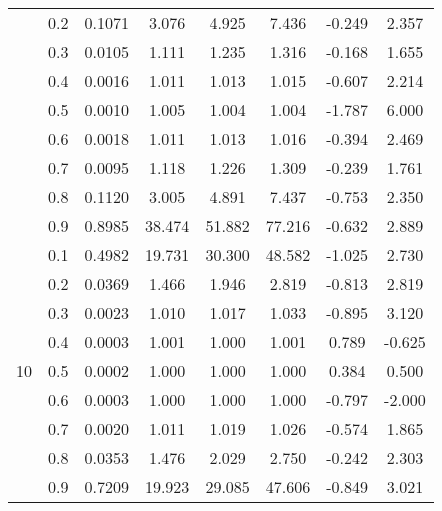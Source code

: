\documentclass[11pt,a4paper]{report}
\begin{document}
\begin{longtable}{ | c | c || c | c | c | c | c | c | }
 & 0.2 & 0.1071 & 3.076 & 4.925 & 7.436 & -0.249 & 2.357 \\
 & 0.3 & 0.0105 & 1.111 & 1.235 & 1.316 & -0.168 & 1.655 \\
 & 0.4 & 0.0016 & 1.011 & 1.013 & 1.015 & -0.607 & 2.214 \\
 & 0.5 & 0.0010 & 1.005 & 1.004 & 1.004 & -1.787 & 6.000 \\
 & 0.6 & 0.0018 & 1.011 & 1.013 & 1.016 & -0.394 & 2.469 \\
 & 0.7 & 0.0095 & 1.118 & 1.226 & 1.309 & -0.239 & 1.761 \\
 & 0.8 & 0.1120 & 3.005 & 4.891 & 7.437 & -0.753 & 2.350 \\
 & 0.9 & 0.8985 & 38.474 & 51.882 & 77.216 & -0.632 & 2.889 \\
 \hline
\multirow{9}{*}{10} & 0.1 & 0.4982 & 19.731 & 30.300 & 48.582 & -1.025 & 2.730 \\
 & 0.2 & 0.0369 & 1.466 & 1.946 & 2.819 & -0.813 & 2.819 \\
 & 0.3 & 0.0023 & 1.010 & 1.017 & 1.033 & -0.895 & 3.120 \\
 & 0.4 & 0.0003 & 1.001 & 1.000 & 1.001 & 0.789 & -0.625 \\
 & 0.5 & 0.0002 & 1.000 & 1.000 & 1.000 & 0.384 & 0.500 \\
 & 0.6 & 0.0003 & 1.000 & 1.000 & 1.000 & -0.797 & -2.000 \\
 & 0.7 & 0.0020 & 1.011 & 1.019 & 1.026 & -0.574 & 1.865 \\
 & 0.8 & 0.0353 & 1.476 & 2.029 & 2.750 & -0.242 & 2.303 \\
 & 0.9 & 0.7209 & 19.923 & 29.085 & 47.606 & -0.849 & 3.021 \\
 \hline
\hline
\end{longtable}
\end{document}
